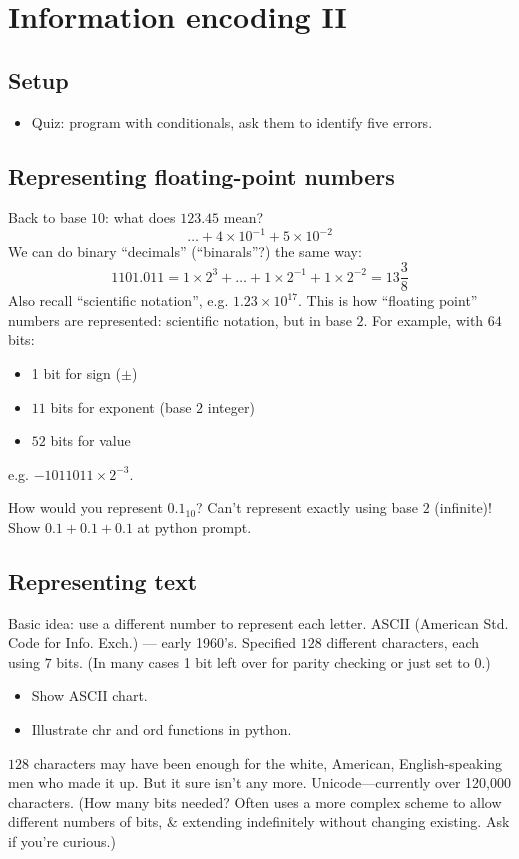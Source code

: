 \documentclass{article}
\begin{document}
\section{Information encoding II}

\subsection*{Setup}
\begin{itemize}
\item Quiz: program with conditionals, ask them to identify five
  errors.
\end{itemize}

\subsection*{Representing floating-point numbers}

Back to base $10$: what does $123.45$ mean?
\[ \dots + 4 \times 10^{-1} + 5 \times 10^{-2} \]
We can do binary ``decimals'' (``binarals''?) the same way: \[
1101.011 = 1 \times 2^3 + \dots + 1 \times 2^{-1} + 1 \times 2^{-2} =
13 \frac{3}{8} \]  Also recall ``scientific notation'', e.g. $1.23
\times 10^{17}$.  This is how ``floating point'' numbers are
represented: scientific notation, but in base $2$.  For example, with
$64$ bits:
\begin{itemize}
\item 1 bit for sign ($\pm$)
\item $11$ bits for exponent (base $2$ integer)
\item $52$ bits for value
\end{itemize}
e.g. $-1011011 \times 2^{-3}$.

How would you represent $0.1_{10}$?  Can't represent exactly using
base $2$ (infinite)! Show $0.1 + 0.1 + 0.1$ at python prompt.

\subsection*{Representing text}

Basic idea: use a different number to represent each letter.  ASCII
(American Std. Code for Info. Exch.) --- early 1960's.  Specified
$128$ different characters, each using $7$ bits.  (In many cases 1 bit
left over for parity checking or just set to $0$.)
\begin{itemize}
\item Show ASCII chart.
\item Illustrate chr and ord functions in python.
\end{itemize}
$128$ characters may have been enough for the white, American,
English-speaking men who made it up.  But it sure isn't any more.
Unicode---currently over 120,000 characters. (How many bits needed?
Often uses a more complex scheme to allow different numbers of bits,
\& extending indefinitely without changing existing.  Ask if you're
curious.)
\end{document}

